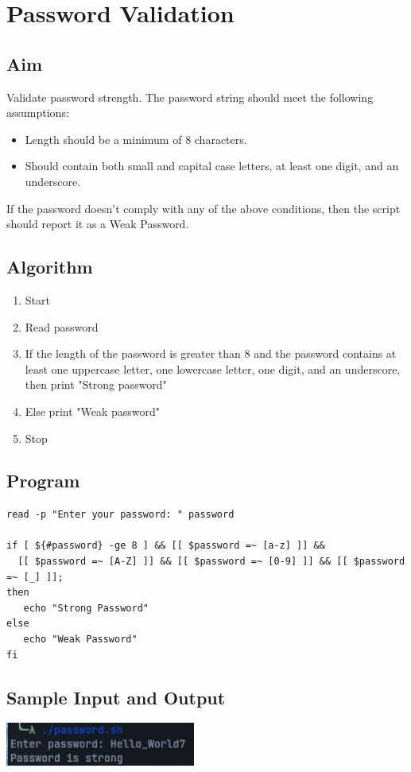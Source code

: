 \section{Password Validation}

\subsection{Aim}
Validate password strength. The password string should meet the following assumptions:
\begin{itemize}
   \item Length should be a minimum of 8 characters.
   \item Should contain both small and capital case letters, at least one digit, and an underscore.
\end{itemize}
If the password doesn't comply with any of the above conditions, then the script should report it as a Weak Password.

\subsection{Algorithm}
\begin{enumerate}
   \item Start
   \item Read password
   \item If the length of the password is greater than 8 and the password contains at least one uppercase letter, one lowercase letter, one digit, and an underscore, then print "Strong password"
   \item Else print "Weak password"
   \item Stop
\end{enumerate}

\subsection{Program}
\begin{lstlisting}[label={list:program:password_validation}]
read -p "Enter your password: " password

if [ ${#password} -ge 8 ] && [[ $password =~ [a-z] ]] &&
  [[ $password =~ [A-Z] ]] && [[ $password =~ [0-9] ]] && [[ $password =~ [_] ]];
then
   echo "Strong Password"
else
   echo "Weak Password"
fi
\end{lstlisting}

\subsection{Sample Input and Output}
\includegraphics[]{Cycle_1//Outputs/password.png}


